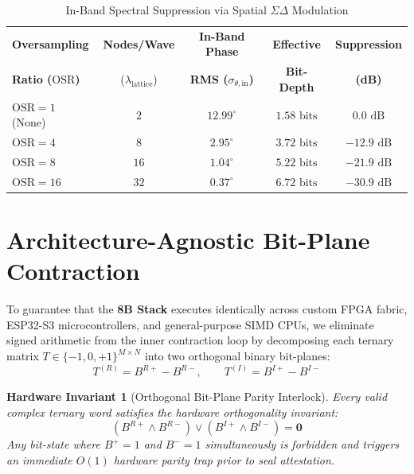 \documentclass[10pt, twocolumn, a4paper]{article}
\newtheorem{invariant}{Hardware Invariant}
\begin{document}
\begin{table}[h!]
\centering
\caption{In-Band Spectral Suppression via Spatial $\Sigma\Delta$ Modulation}
\vspace{4pt}
\footnotesize
\begin{tabular}{@{}lcccc@{}}
\toprule
\textbf{Oversampling} & \textbf{Nodes/Wave} & \textbf{In-Band Phase} & \textbf{Effective} & \textbf{Suppression} \\
\textbf{Ratio ($\text{OSR}$)} & ($\lambda_{\text{lattice}}$) & \textbf{RMS ($\sigma_{\theta,\text{in}}$)} & \textbf{Bit-Depth} & \textbf{(dB)} \\
\midrule
$\text{OSR} = 1$ (None) & $2$ & $12.99^\circ$ & $1.58\text{ bits}$ & $0.0\text{ dB}$ \\
$\text{OSR} = 4$ & $8$ & $2.95^\circ$ & $3.72\text{ bits}$ & $-12.9\text{ dB}$ \\
$\text{OSR} = 8$ & $16$ & $1.04^\circ$ & $5.22\text{ bits}$ & $-21.9\text{ dB}$ \\
$\text{OSR} = 16$ & $32$ & $0.37^\circ$ & $6.72\text{ bits}$ & $-30.9\text{ dB}$ \\
\bottomrule
\end{tabular}
\label{tab:osr}
\end{table}

\section{Architecture-Agnostic Bit-Plane Contraction}

To guarantee that the \textbf{8B Stack} executes identically across custom FPGA fabric, ESP32-S3 microcontrollers, and general-purpose SIMD CPUs, we eliminate signed arithmetic from the inner contraction loop by decomposing each ternary matrix $T \in \{-1, 0, +1\}^{M \times N}$ into two orthogonal binary bit-planes:
\begin{equation}
T^{(R)} = B^{R+} - B^{R-}, \qquad T^{(I)} = B^{I+} - B^{I-}
\end{equation}

\begin{invariant}[Orthogonal Bit-Plane Parity Interlock]
Every valid complex ternary word satisfies the hardware orthogonality invariant:
\begin{equation}
\left(B^{R+} \land B^{R-}\right) \lor \left(B^{I+} \land B^{I-}\right) = \mathbf{0}
\end{equation}
Any bit-state where $B^+ = 1$ and $B^- = 1$ simultaneously is forbidden and triggers an immediate $O(1)$ hardware parity trap prior to seal attestation.
\end{invariant}
\end{document}
